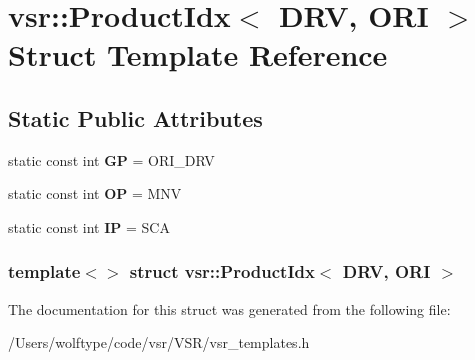 \hypertarget{structvsr_1_1_product_idx_3_01_d_r_v_00_01_o_r_i_01_4}{\section{vsr\-:\-:Product\-Idx$<$ D\-R\-V, O\-R\-I $>$ Struct Template Reference}
\label{structvsr_1_1_product_idx_3_01_d_r_v_00_01_o_r_i_01_4}
}
\subsection*{Static Public Attributes}
\begin{DoxyCompactItemize}
\item 
\hypertarget{structvsr_1_1_product_idx_3_01_d_r_v_00_01_o_r_i_01_4_a8119c420f6230298bcfa99686cf8d849}{static const int {\bfseries G\-P} = O\-R\-I\-\_\-\-D\-R\-V}\label{structvsr_1_1_product_idx_3_01_d_r_v_00_01_o_r_i_01_4_a8119c420f6230298bcfa99686cf8d849}

\item 
\hypertarget{structvsr_1_1_product_idx_3_01_d_r_v_00_01_o_r_i_01_4_a3f68865f3b2c5b135e16f4983e54e924}{static const int {\bfseries O\-P} = M\-N\-V}\label{structvsr_1_1_product_idx_3_01_d_r_v_00_01_o_r_i_01_4_a3f68865f3b2c5b135e16f4983e54e924}

\item 
\hypertarget{structvsr_1_1_product_idx_3_01_d_r_v_00_01_o_r_i_01_4_ae5595c374cf6bbc6facb65cac760d97e}{static const int {\bfseries I\-P} = S\-C\-A}\label{structvsr_1_1_product_idx_3_01_d_r_v_00_01_o_r_i_01_4_ae5595c374cf6bbc6facb65cac760d97e}

\end{DoxyCompactItemize}
\subsubsection*{template$<$$>$ struct vsr\-::\-Product\-Idx$<$ D\-R\-V, O\-R\-I $>$}



The documentation for this struct was generated from the following file\-:\begin{DoxyCompactItemize}
\item 
/\-Users/wolftype/code/vsr/\-V\-S\-R/vsr\-\_\-templates.\-h\end{DoxyCompactItemize}
